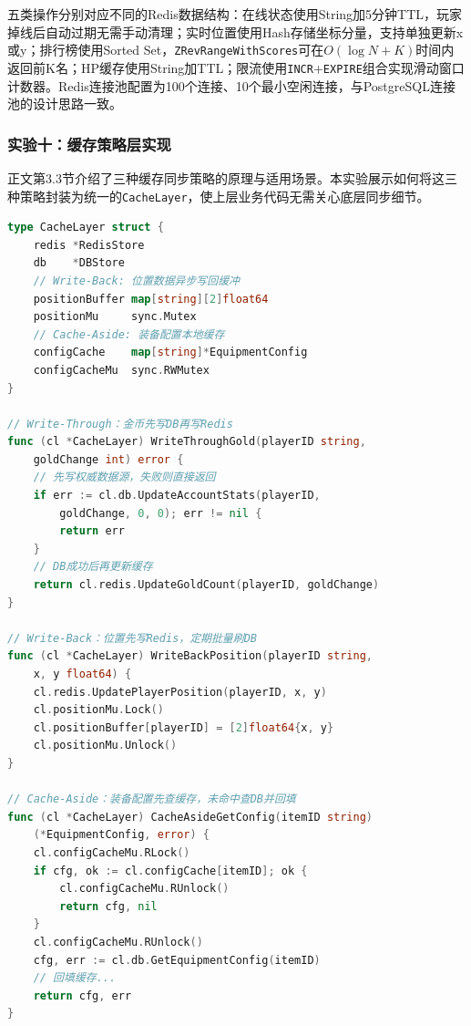 五类操作分别对应不同的Redis数据结构：在线状态使用String加5分钟TTL，玩家掉线后自动过期无需手动清理；实时位置使用Hash存储坐标分量，支持单独更新x或y；排行榜使用Sorted Set，\texttt{ZRevRangeWithScores}可在$O(\log N + K)$时间内返回前K名；HP缓存使用String加TTL；限流使用\texttt{INCR}+\texttt{EXPIRE}组合实现滑动窗口计数器。Redis连接池配置为100个连接、10个最小空闲连接，与PostgreSQL连接池的设计思路一致。

\subsubsection{实验十：缓存策略层实现}

正文第3.3节介绍了三种缓存同步策略的原理与适用场景。本实验展示如何将这三种策略封装为统一的\texttt{CacheLayer}，使上层业务代码无需关心底层同步细节。

\begin{tcolorbox}[title=三种缓存策略的实现骨架]
\begin{lstlisting}[style=codeblock, language=go]
type CacheLayer struct {
    redis *RedisStore
    db    *DBStore
    // Write-Back: 位置数据异步写回缓冲
    positionBuffer map[string][2]float64
    positionMu     sync.Mutex
    // Cache-Aside: 装备配置本地缓存
    configCache    map[string]*EquipmentConfig
    configCacheMu  sync.RWMutex
}

// Write-Through：金币先写DB再写Redis
func (cl *CacheLayer) WriteThroughGold(playerID string,
    goldChange int) error {
    // 先写权威数据源，失败则直接返回
    if err := cl.db.UpdateAccountStats(playerID,
        goldChange, 0, 0); err != nil {
        return err
    }
    // DB成功后再更新缓存
    return cl.redis.UpdateGoldCount(playerID, goldChange)
}

// Write-Back：位置先写Redis，定期批量刷DB
func (cl *CacheLayer) WriteBackPosition(playerID string,
    x, y float64) {
    cl.redis.UpdatePlayerPosition(playerID, x, y)
    cl.positionMu.Lock()
    cl.positionBuffer[playerID] = [2]float64{x, y}
    cl.positionMu.Unlock()
}

// Cache-Aside：装备配置先查缓存，未命中查DB并回填
func (cl *CacheLayer) CacheAsideGetConfig(itemID string)
    (*EquipmentConfig, error) {
    cl.configCacheMu.RLock()
    if cfg, ok := cl.configCache[itemID]; ok {
        cl.configCacheMu.RUnlock()
        return cfg, nil
    }
    cl.configCacheMu.RUnlock()
    cfg, err := cl.db.GetEquipmentConfig(itemID)
    // 回填缓存...
    return cfg, err
}
\end{lstlisting}
\end{tcolorbox}

